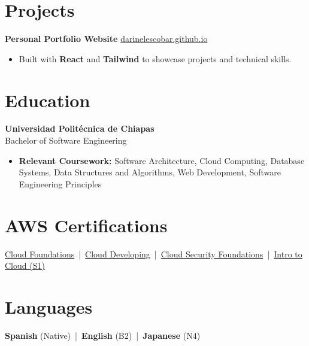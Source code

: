 \section{Projects}
\textbf{Personal Portfolio Website} \hfill {}\;\href{https://darinelescobar.github.io/}{darinelescobar.github.io}
\begin{itemize}
    \item Built with \textbf{React} and \textbf{Tailwind} to showcase projects and technical skills.
\end{itemize}

\section{Education}
\textbf{Universidad Polit\'ecnica de Chiapas} \\
Bachelor of Software Engineering
\begin{itemize}
    \item \textbf{Relevant Coursework:} Software Architecture, Cloud Computing, Database Systems, Data Structures and Algorithms, Web Development, Software Engineering Principles
\end{itemize}

\section{AWS Certifications}
\href{https://www.credly.com/badges/17c50411-0cbe-4586-bd34-00c130c92e22/public_url}{\faCertificate\; Cloud Foundations} \,|\,
\href{https://www.credly.com/badges/920866d4-e314-469b-87d3-b4da8c069864/public_url}{\faCertificate\; Cloud Developing} \,|\,
\href{https://www.credly.com/badges/dbcfcfd3-7d99-4877-b777-1489e1edf8d5/public_url}{\faCertificate\; Cloud Security Foundations} \,|\,
\href{https://www.credly.com/badges/657cf76c-0b10-40ba-a55d-62f35c764ac2/public_url}{\faCertificate\; Intro to Cloud (S1)}

\section{Languages}
\textbf{Spanish} (Native) \,|\, \textbf{English} (B2) \,|\, \textbf{Japanese} (N4)